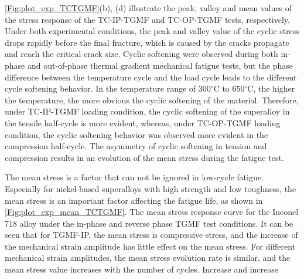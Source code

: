 \documentclass[preprint,5p,twocolumn,11pt,sort&compress]{elsarticle}
\begin{document}
\autoref{Fig:plot_exp_TCTGMF}(b), (d) illustrate the peak, valley and mean values of the stress response of the TC-IP-TGMF and TC-OP-TGMF tests, respectively.
Under both experimental conditions, the peak and valley value of the cyclic stress drops rapidly before the final fracture, which is caused by the cracks propagate and reach the critical crack size.
Cyclic softening were observed during both in-phase and out-of-phase thermal gradient mechanical fatigue tests, but the phase difference between the temperature cycle and the load cycle leads to the different cycle softening behavior. In the temperature range of 300$^\circ$C to 650$^\circ$C, the higher the temperature, the more obvious the cyclic softening of the material. Therefore, under TC-IP-TGMF loading condition, the cyclic softening of the superalloy in the tensile half-cycle is more evident, whereas, under TC-OP-TGMF loading condition, the cyclic softening behavior was observed more evident in the compression half-cycle. The asymmetry of cyclic softening in tension and compression results in an evolution of the mean stress during the fatigue test.

The mean stress is a factor that can not be ignored in low-cycle fatigue. Especially for nickel-based superalloys with high strength and low toughness, the mean stress is an important factor affecting the fatigue life, as shown in \autoref{Fig:plot_exp_mean_TCTGMF}. The mean stress response curve for the Inconel 718 alloy under the in-phase and reverse phase TGMF test conditions. It can be seen that for TGMF-IP, the mean stress is compressive stress, and the increase of the mechanical strain amplitude has little effect on the mean stress. For different mechanical strain amplitudes, the mean stress evolution rate is similar, and the mean stress value increases with the number of cycles. Increase and increase
\end{document}
